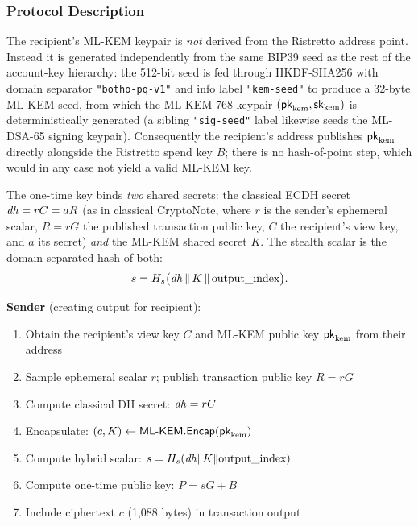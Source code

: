 \subsubsection{Protocol Description}

The recipient's ML-KEM keypair is \emph{not} derived from the Ristretto
address point. Instead it is generated independently from the same BIP39
seed as the rest of the account-key hierarchy: the 512-bit seed is fed
through HKDF-SHA256 with domain separator \texttt{"botho-pq-v1"} and info
label \texttt{"kem-seed"} to produce a 32-byte ML-KEM seed, from which the
ML-KEM-768 keypair $(\mathsf{pk}_{\text{kem}}, \mathsf{sk}_{\text{kem}})$ is deterministically
generated (a sibling \texttt{"sig-seed"} label likewise seeds the ML-DSA-65
signing keypair). Consequently the recipient's address publishes
$\mathsf{pk}_{\text{kem}}$ directly alongside the Ristretto spend key $B$; there is
no hash-of-point step, which would in any case not yield a valid ML-KEM key.

The one-time key binds \emph{two} shared secrets: the classical ECDH secret
$\mathit{dh} = rC = aR$ (as in classical CryptoNote, where $r$ is the sender's
ephemeral scalar, $R = rG$ the published transaction public key, $C$ the
recipient's view key, and $a$ its secret) \emph{and} the ML-KEM shared secret
$K$. The stealth scalar is the domain-separated hash of both:
\[
  s = H_s\bigl(\mathit{dh} \,\|\, K \,\|\, \text{output\_index}\bigr).
\]

\textbf{Sender} (creating output for recipient):
\begin{enumerate}
  \item Obtain the recipient's view key $C$ and ML-KEM public key
    $\mathsf{pk}_{\text{kem}}$ from their address
  \item Sample ephemeral scalar $r$; publish transaction public key $R = rG$
  \item Compute classical DH secret: $\mathit{dh} = rC$
  \item Encapsulate: $(c, K) \leftarrow \textsf{ML-KEM}.\mathsf{Encap}(\mathsf{pk}_{\text{kem}})$
  \item Compute hybrid scalar: $s = H_s(\mathit{dh} \| K \| \text{output\_index})$
  \item Compute one-time public key: $P = sG + B$
  \item Include ciphertext $c$ (1,088 bytes) in transaction output
\end{enumerate}

